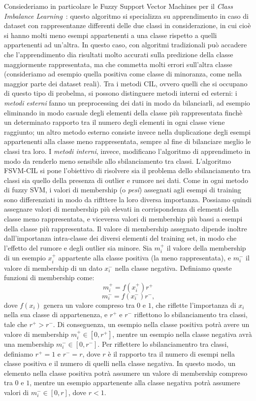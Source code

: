\documentclass[oneside, openany]{book}
\begin{document}
	Consiederiamo in particolare le Fuzzy Support Vector Machines per il \textit{Class Imbalance Learning}~\cite{bib:cil}: questo algoritmo si specializza su apprendimento in caso di dataset con rappresentanze differenti delle due classi in considerazione, in cui cioè si hanno molti meno esempi appartenenti a una classe rispetto a quelli appartenenti ad un'altra. In questo caso, con algoritmi tradizionali può accadere che l'apprendimento dia risultati molto accurati sulla predizione della classe maggiormente rappresentata, ma che commetta molti errori sull'altra classe (consideriamo ad esempio quella positiva come classe di minoranza, come nella maggior parte dei dataset reali).\newline
	Tra i metodi CIL, ovvero quelli che si occupano di questo tipo di probelma, si possono distinguere metodi interni ed esterni: i \textit{metodi esterni} fanno un preprocessing dei dati in modo da bilanciarli, ad esempio eliminando in modo casuale degli elementi della classe più rappresentata finchè un determinato rapporto tra il numero degli elementi in ogni classe viene raggiunto; un altro metodo esterno consiste invece nella duplicazione degli esempi appartenenti alla classe meno rappresentata, sempre al fine di bilanciare meglio le classi tra loro. I \textit{metodi interni}, invece, modificano l'algoritmo di apprendimeto in modo da renderlo meno sensibile allo sbilanciamento tra classi.\newline 
	L'algoritmo FSVM-CIL si pone l'obiettivo di risolvere sia il problema dello sbilanciamento tra classi sia quello della presenza di outlier e rumore nei dati. Come in ogni metodo di fuzzy SVM, i valori di membership (o \textit{pesi}) assegnati agli esempi di training sono differenziati in modo da riflttere la loro diversa importanza. Possiamo quindi assegnare valori di membership più elevati in corrispondenza di elementi della classe meno rappresentata, e viceversa valori di membership più bassi a esempi della classe più rappresentata. Il valore di membership assegnato dipende inoltre dall'importanza intra-classe dei diversi elementi del training set, in modo che l'effetto del rumore e degli outlier sia minore.\newline
	Sia $m_i^+$ il valore della membership di un esempio $x_i^+$ appartente alla classe positiva (la meno rappresentata), e $m_i^-$ il valore di membership di un dato $x_i^-$ nella classe negativa. Definiamo queste funzioni di membership come:
		\[
			m_i^+ = f(x_i^+)r^+
		\]
		\[	
			m_i^- = f(x_i^-)r^-\text{,}
		\]
	dove $f(x_i)$ genera un valore compreso tra $0$ e $1$, che riflette l'importanza di $x_i$ nella sua classe di appartenenza, e $r^+$ e $r^-$ riflettono lo sbilanciamento tra classi, tale che $r^+>r^-$.	Di conseguenza, un esempio nella classe positiva potrà avere un valore di membership $m_i^+ \in [0,r^+]$, mentre un esempio nella classe negativa avrà una membership $m_i^- \in [0,r^-]$. Per riflettere lo sbilanciamentro tra classi, definiamo $r^+=1$ e $r^-=r$, dove $r$ è il rapporto tra il numero di esempi nella classe positiva e il numero di quelli nella classe negativa. In questo modo, un elemento nella classe positiva potrà assumere un valore di membership compreso tra $0$ e $1$, mentre un esempio appartenente alla classe negativa potrà assumere valori di $m_i^- \in [0,r]$, dove $r<1$.
\end{document}
